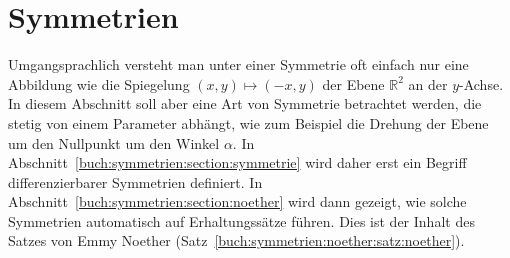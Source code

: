 %
%
%
\chapter{Symmetrien
\label{buch:chapter:symmetrien}}
Umgangsprachlich versteht man unter einer Symmetrie oft einfach  nur
eine Abbildung wie die Spiegelung
\(
(x,y)\mapsto (-x,y)
\)
der Ebene $\mathbb{R}^2$ an der $y$-Achse.
In diesem Abschnitt soll aber eine Art von Symmetrie betrachtet
werden, die stetig von einem Parameter abhängt, wie zum Beispiel
die Drehung der Ebene um den Nullpunkt um den Winkel $\alpha$.
In Abschnitt~\ref{buch:symmetrien:section:symmetrie} wird daher
erst ein Begriff differenzierbarer Symmetrien definiert.
In Abschnitt~\ref{buch:symmetrien:section:noether} wird dann gezeigt,
wie solche Symmetrien automatisch auf Erhaltungssätze führen.
Dies ist der Inhalt des Satzes von Emmy Noether
(Satz~\ref{buch:symmetrien:noether:satz:noether}).




\uebungsabschnitt

\begin{uebungsaufgaben}
\end{uebungsaufgaben}
\enduebungsabschnitt

